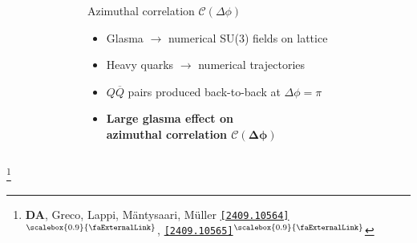 \documentclass[aspectratio=169,11pt,usenames,dvipsnames]{beamer}
\renewcommand{\thefootnote}{\color{customblue}\faPaperPlaneO}
\newcommand\blfootnote[1]{%
  \begingroup
  \renewcommand\thefootnote{}\footnote{#1}%
  \addtocounter{footnote}{-1}%
  \endgroup
}
\begin{document}
\begin{frame}[t,noframenumbering]
\begin{columns}[onlytextwidth,t]
\begin{figure}
        \end{figure}
        \begin{center}
            {\Large\color{isgold} Azimuthal correlation $\mathcal{C}(\Delta\phi)$\\[10pt]}
            \footnotesize
                \begin{itemize}
                    \item {\color{lightgray}Glasma $\rightarrow$ numerical SU($3$) fields on lattice}
                    \item {\color{lightgray}Heavy quarks $\rightarrow$ numerical trajectories}
                    \item {\color{lightgray}$Q\overline{Q}$ pairs produced back-to-back at $\Delta\phi=\pi$}\\[15pt]
                    \item {\color{destacado}\bfseries\normalsize{Large glasma effect on\\ azimuthal correlation $\boldsymbol{\mathcal{C}(\Delta\phi)}$}}
                \end{itemize}
        \end{center}
    \end{columns}
    \vspace{-5pt}
    \blfootnote{\scriptsize \textbf{DA}, Greco, Lappi, Mäntysaari, M\"{u}ller \href{https://arxiv.org/abs/2409.10564}{\color{palgold}\texttt{[2409.10564]}$^\text{\scalebox{0.9}{\faExternalLink}}$}, \href{https://arxiv.org/abs/2409.10565}{\color{palgold}\texttt{[2409.10565]}$^\text{\scalebox{0.9}{\faExternalLink}}$}}
\end{frame}

\end{document}
